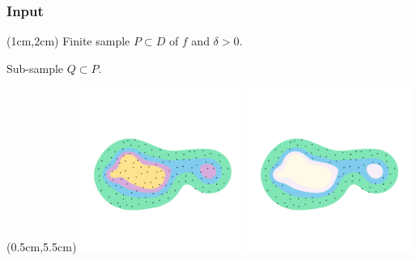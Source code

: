 \begin{frame}
  \frametitle{Input}

  \begin{textblock*}{11cm}(1cm,2cm)
    Finite sample $P\subset D$ of $f$ and $\delta > 0$.\vspace{1ex}

    Sub-sample $Q\subset P$.
  \end{textblock*}

  \begin{textblock*}{12cm}(0.5cm,5.5cm)
    \includegraphics[trim=100 500 100 700, clip, width=0.4\textwidth]{figures/rips_dense2_2/samples}\hspace{6ex}%
    \includegraphics[trim=100 500 100 700, clip, width=0.4\textwidth]{figures/rips_dense2_2/Qsample}
  \end{textblock*}
\end{frame}

